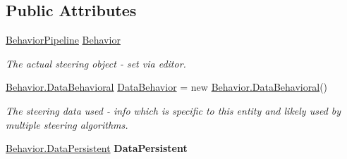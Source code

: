 \subsection*{Public Attributes}
\begin{DoxyCompactItemize}
\item 
\hyperlink{class_skyrates_1_1_a_i_1_1_composite_1_1_behavior_pipeline}{Behavior\-Pipeline} \hyperlink{class_skyrates_1_1_entity_1_1_entity_a_i_af3189775311273e2c00fa92c8ec37764}{Behavior}
\begin{DoxyCompactList}\small\item\em The actual steering object -\/ set via editor. \end{DoxyCompactList}\item 
\hyperlink{class_skyrates_1_1_a_i_1_1_behavior_1_1_data_behavioral}{Behavior.\-Data\-Behavioral} \hyperlink{class_skyrates_1_1_entity_1_1_entity_a_i_afd9ea7ff8d90b2042e25656bd950781e}{Data\-Behavior} = new \hyperlink{class_skyrates_1_1_a_i_1_1_behavior_1_1_data_behavioral}{Behavior.\-Data\-Behavioral}()
\begin{DoxyCompactList}\small\item\em The steering data used -\/ info which is specific to this entity and likely used by multiple steering algorithms. \end{DoxyCompactList}\item 
\hypertarget{class_skyrates_1_1_entity_1_1_entity_a_i_a1ed25ead726c374836aa837549a7d5a0}{\hyperlink{class_skyrates_1_1_a_i_1_1_behavior_1_1_data_persistent}{Behavior.\-Data\-Persistent} {\bfseries Data\-Persistent}}\label{class_skyrates_1_1_entity_1_1_entity_a_i_a1ed25ead726c374836aa837549a7d5a0}

\end{DoxyCompactItemize}
